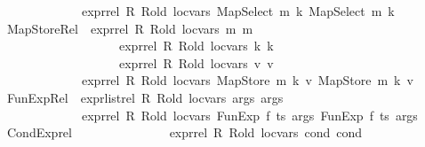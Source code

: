 \begin{isabellebody}
\ \ \ \ \ \ \ \ \ \ \ \ \ \ expr{\isacharunderscore}{\kern0pt}rel\ R\ R{\isacharunderscore}{\kern0pt}old\ loc{\isacharunderscore}{\kern0pt}vars\ {\isacharparenleft}{\kern0pt}MapSelect\ m\ k{\isacharparenright}{\kern0pt}\ {\isacharparenleft}{\kern0pt}MapSelect\ m{\isacharprime}{\kern0pt}\ k{\isacharprime}{\kern0pt}{\isacharparenright}{\kern0pt}{\isachardoublequoteclose}\isanewline
\ {\isacharbar}{\kern0pt}\ MapStore{\isacharunderscore}{\kern0pt}Rel{\isacharcolon}{\kern0pt}\ {\isachardoublequoteopen}{\isasymlbrakk}\ expr{\isacharunderscore}{\kern0pt}rel\ R\ R{\isacharunderscore}{\kern0pt}old\ loc{\isacharunderscore}{\kern0pt}vars\ m\ m{\isacharprime}{\kern0pt}{\isacharsemicolon}{\kern0pt}\isanewline
\ \ \ \ \ \ \ \ \ \ \ \ \ \ \ \ \ \ \ \ expr{\isacharunderscore}{\kern0pt}rel\ R\ R{\isacharunderscore}{\kern0pt}old\ loc{\isacharunderscore}{\kern0pt}vars\ k\ k{\isacharprime}{\kern0pt}{\isacharsemicolon}{\kern0pt}\isanewline
\ \ \ \ \ \ \ \ \ \ \ \ \ \ \ \ \ \ \ \ expr{\isacharunderscore}{\kern0pt}rel\ R\ R{\isacharunderscore}{\kern0pt}old\ loc{\isacharunderscore}{\kern0pt}vars\ v\ v{\isacharprime}{\kern0pt}\ {\isasymrbrakk}\ {\isasymLongrightarrow}\ \isanewline
\ \ \ \ \ \ \ \ \ \ \ \ \ \ expr{\isacharunderscore}{\kern0pt}rel\ R\ R{\isacharunderscore}{\kern0pt}old\ loc{\isacharunderscore}{\kern0pt}vars\ {\isacharparenleft}{\kern0pt}MapStore\ m\ k\ v{\isacharparenright}{\kern0pt}\ {\isacharparenleft}{\kern0pt}MapStore\ m{\isacharprime}{\kern0pt}\ k{\isacharprime}{\kern0pt}\ v{\isacharprime}{\kern0pt}{\isacharparenright}{\kern0pt}{\isachardoublequoteclose}\isanewline
\ {\isacharbar}{\kern0pt}\ FunExp{\isacharunderscore}{\kern0pt}Rel{\isacharcolon}{\kern0pt}\ {\isachardoublequoteopen}{\isasymlbrakk}\ expr{\isacharunderscore}{\kern0pt}list{\isacharunderscore}{\kern0pt}rel\ R\ R{\isacharunderscore}{\kern0pt}old\ loc{\isacharunderscore}{\kern0pt}vars\ args{}\ args{}\ {\isasymrbrakk}\ \ {\isasymLongrightarrow}\ \isanewline
\ \ \ \ \ \ \ \ \ \ \ \ \ \ expr{\isacharunderscore}{\kern0pt}rel\ R\ R{\isacharunderscore}{\kern0pt}old\ loc{\isacharunderscore}{\kern0pt}vars\ {\isacharparenleft}{\kern0pt}FunExp\ f\ ts\ args{}{\isacharparenright}{\kern0pt}\ {\isacharparenleft}{\kern0pt}FunExp\ f\ ts\ args{}{\isacharparenright}{\kern0pt}{\isachardoublequoteclose}\isanewline
\ {\isacharbar}{\kern0pt}\ CondExp{\isacharunderscore}{\kern0pt}rel{\isacharcolon}{\kern0pt}\isanewline
\ \ \ \ \ \ \ \ \ \ \ \ \ \ {\isachardoublequoteopen}{\isasymlbrakk}\ expr{\isacharunderscore}{\kern0pt}rel\ R\ R{\isacharunderscore}{\kern0pt}old\ loc{\isacharunderscore}{\kern0pt}vars\ cond{}\ cond{}{\isacharsemicolon}{\kern0pt}\isanewline

\end{isabellebody}
